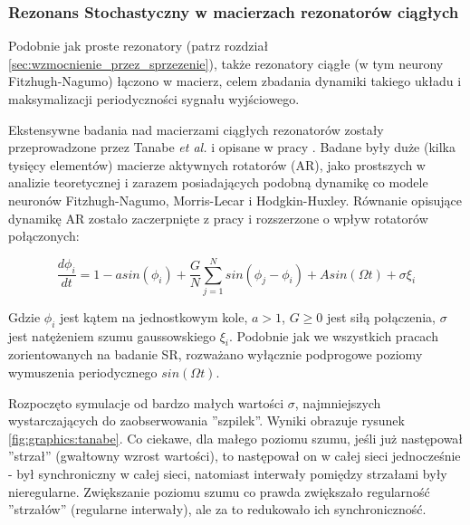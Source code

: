 
  \subsubsection{Rezonans Stochastyczny w macierzach rezonatorów ciągłych}

  Podobnie jak proste rezonatory (patrz rozdział \ref{sec:wzmocnienie_przez_sprzezenie}), także rezonatory ciągłe (w tym neurony Fitzhugh-Nagumo) łączono w macierz, celem zbadania dynamiki takiego układu i maksymalizacji periodyczności sygnału wyjściowego. 

  Ekstensywne badania nad macierzami ciągłych rezonatorów zostały przeprowadzone przez Tanabe \emph{et al.} i opisane w pracy \cite{tanabe_shimokawa}. Badane były duże (kilka tysięcy elementów) macierze aktywnych rotatorów (AR), jako prostszych w analizie teoretycznej i zarazem posiadających podobną dynamikę co modele neuronów Fitzhugh-Nagumo, Morris-Lecar i Hodgkin-Huxley. Równanie opisujące dynamikę AR zostało zaczerpnięte z pracy \cite{shinomoto} i rozszerzone o wpływ rotatorów połączonych:

  \begin{equation}
    \frac{d \phi_i}{dt} = 1 - a sin(\phi_i) + \frac{G}{N} \sum\limits_{j=1}^{N} sin(\phi_j - \phi_i) + A sin(\Omega t) + \sigma \xi_i
  \end{equation}

  Gdzie $\phi_i$ jest kątem na jednostkowym kole, $a > 1$, $G \ge 0$ jest siłą połączenia, $\sigma$ jest natężeniem szumu gaussowskiego $\xi_i$. Podobnie jak we wszystkich pracach zorientowanych na badanie SR, rozważano wyłącznie podprogowe poziomy wymuszenia periodycznego $sin(\Omega t)$.

  Rozpoczęto symulacje od bardzo małych wartości $\sigma$, najmniejszych wystarczających do zaobserwowania ''szpilek''. Wyniki obrazuje rysunek \ref{fig:graphics:tanabe}. Co ciekawe, dla małego poziomu szumu, jeśli już następował ''strzał'' (gwałtowny wzrost wartości), to następował on w całej sieci jednocześnie - był synchroniczny w całej sieci, natomiast interwały pomiędzy strzałami były nieregularne. Zwiększanie poziomu szumu co prawda zwiększało regularność ''strzałów'' (regularne interwały), ale za to redukowało ich synchroniczność.

